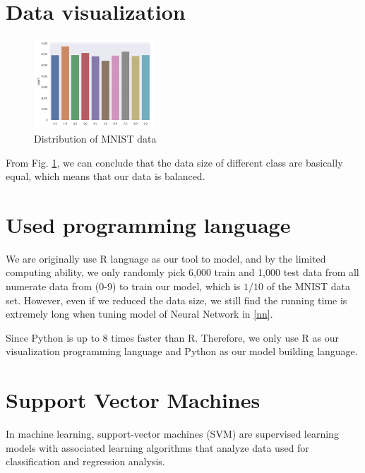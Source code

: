 \documentclass[conference]{IEEEtran}
\begin{document}
\section{Data visualization}
\begin{figure}[htbp]
\centerline{\includegraphics[width=0.4\textwidth]{figure/distributionplot.png}}
\caption{Distribution of MNIST data}
\label{Distribution of MNIST data}
\end{figure}
From Fig. \ref{Distribution of MNIST data}, we can conclude that the data size of different class are basically equal, which means that our data is balanced.






\section{Used programming language}
We are originally use R language as our tool to model, and by the limited computing ability, we only randomly pick 6,000 train and 1,000 test data from all numerate data from (0-9) to train our model, which is $1/10$ of the MNIST data set. However, even if we reduced the data size, we still find the running time is extremely long when tuning model of Neural Network in \ref{nn}. 

Since Python is up to 8 times faster than R. Therefore, we only use R as our visualization programming language\cite{wickham2016ggplot2} and Python as our model building language.


\section{Support Vector Machines}
In machine learning, support-vector machines (SVM) are supervised learning models with associated learning algorithms that analyze data used for classification and regression analysis.
\end{document}
